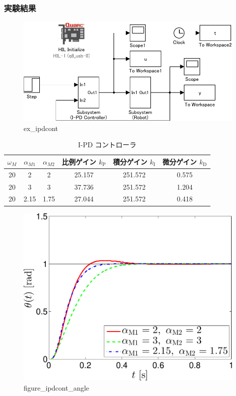 \subsubsection{実験結果}
\begin{figure}[h]
  \centering
  \includegraphics[scale=1]{sozai/ex_ipdcont-crop.pdf}
  \caption{ex\_ipdcont}
\end{figure}

\begin{table}[H]
  \centering
  \caption{I-PD コントローラ}
  \begin{tabular}{|c|c|c|c|c|c|}
    \hline
    $\omega_M$ & $\alpha_{M1}$ & $\alpha_{M2}$ & 比例ゲイン $k_{\mathrm{P}}$ & 積分ゲイン $k_{\mathrm{I}}$ & 微分ゲイン $k_{\mathrm{D}}$ \\ \hline
    20         & 2             & 2             & 25.157                      & 251.572                     & 0.575                       \\ \hline
    20         & 3             & 3             & 37.736                      & 251.572                     & 1.204                       \\ \hline
    20         & 2.15          & 1.75          & 27.044                      & 251.572                     & 0.418                       \\ \hline
  \end{tabular}
\end{table}


\begin{figure}[h]
  \centering
  \includegraphics[scale=0.5]{sozai/figure_ipdcont_angle-crop.pdf}
  \caption{figure\_ipdcont\_angle}
\end{figure}

